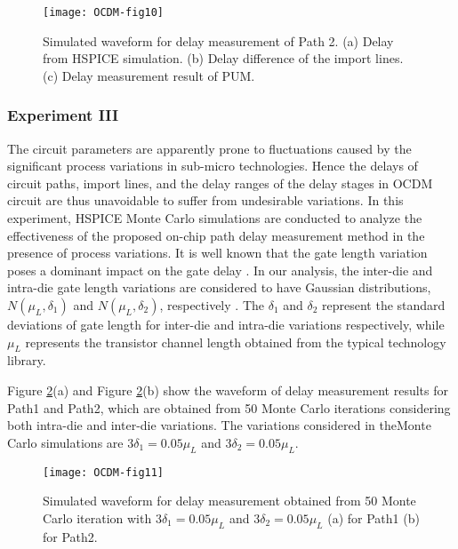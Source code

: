 \begin{figure}[t]
\centering
\texttt{[image: OCDM-fig10]}
    \caption{Simulated waveform for delay measurement of Path 2. (a) Delay from HSPICE simulation. (b) Delay difference of the import lines. (c) Delay measurement result of PUM.}
    \label{fig:OCDM-fig10}
\end{figure}

\subsubsection{Experiment III}
The circuit parameters are apparently prone to fluctuations caused by the significant process variations in sub-micro technologies. Hence the delays of circuit paths, import lines, and the delay ranges of the delay stages in OCDM circuit are thus unavoidable to suffer from undesirable variations. In this experiment, HSPICE Monte Carlo simulations are conducted to analyze the effectiveness of the proposed on-chip path delay measurement method in the presence of process variations. It is well known that the gate length variation poses a dominant impact on the gate delay \cite{nassif2000delay} \cite{agarwal2003statisticalc}. In our analysis, the inter-die and intra-die gate length variations are considered to have Gaussian distributions, $N(\mu_{L}, \delta_{1})$ and $N(\mu_{L}, \delta_{2})$, respectively \cite{wang2008path} \cite{tayade2008small}. The $\delta_{1}$ and $\delta_{2}$ represent the standard deviations of gate length for inter-die and intra-die variations respectively, while $\mu_{L}$ represents the transistor channel length obtained from the typical technology library.

Figure \ref{fig:OCDM-fig11}(a) and Figure \ref{fig:OCDM-fig11}(b) show the waveform of delay measurement results for Path1 and Path2, which are obtained from 50 Monte Carlo iterations considering both intra-die and inter-die variations. The variations considered in theMonte Carlo simulations are $3\delta_{1}=0.05\mu_{L}$ and $3\delta_{2}=0.05\mu_{L}$.

\begin{figure}[t]
\centering
\texttt{[image: OCDM-fig11]}
    \caption{Simulated waveform for delay measurement obtained from 50 Monte Carlo iteration with $3\delta_{1}=0.05\mu_{L}$ and $3\delta_{2}=0.05\mu_{L}$ (a) for Path1 (b) for Path2.}
    \label{fig:OCDM-fig11}
\end{figure}


